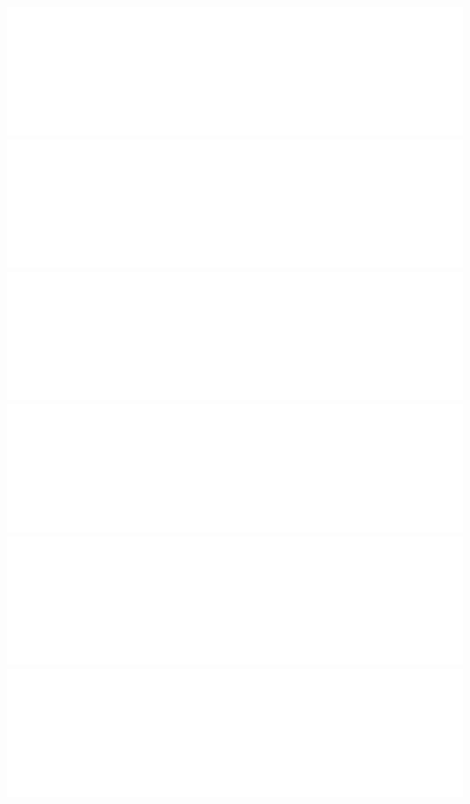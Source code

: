 \documentclass{beamer}
\begin{document}
\begin{frame}
        \includegraphics[height=0.023\textheight]{spatial-denoised/wavelet_den_43.png}
        \includegraphics[height=0.023\textheight]{spatial-denoised/wavelet_den_44.png}
        \includegraphics[height=0.023\textheight]{spatial-denoised/wavelet_den_45.png}\\
        \includegraphics[height=0.023\textheight]{spatial-denoised/wavelet_den_46.png}
        \includegraphics[height=0.023\textheight]{spatial-denoised/wavelet_den_47.png}
        \includegraphics[height=0.023\textheight]{spatial-denoised/wavelet_den_48.png}

\end{frame}
\end{document}
